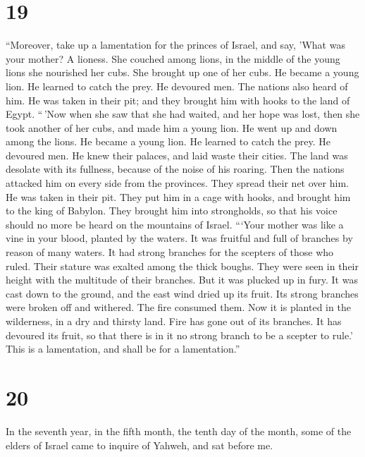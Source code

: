 \hypertarget{section-17}{%
\section{19}\label{section-17}}

 ``Moreover, take up a lamentation for the princes of
Israel,  and say, 'What was your mother? A lioness. She
couched among lions, in the middle of the young lions she nourished her
cubs.  She brought up one of her cubs. He became a young
lion. He learned to catch the prey. He devoured men.  The
nations also heard of him. He was taken in their pit; and they brought
him with hooks to the land of Egypt.  ``\,'Now when she
saw that she had waited, and her hope was lost, then she took another of
her cubs, and made him a young lion.  He went up and down
among the lions. He became a young lion. He learned to catch the prey.
He devoured men.  He knew their palaces, and laid waste
their cities. The land was desolate with its fullness, because of the
noise of his roaring.  Then the nations attacked him on
every side from the provinces. They spread their net over him. He was
taken in their pit.  They put him in a cage with hooks,
and brought him to the king of Babylon. They brought him into
strongholds, so that his voice should no more be heard on the mountains
of Israel.  ```Your mother was like a vine in your blood,
planted by the waters. It was fruitful and full of branches by reason of
many waters.  It had strong branches for the scepters of
those who ruled. Their stature was exalted among the thick boughs. They
were seen in their height with the multitude of their branches.
 But it was plucked up in fury. It was cast down to the
ground, and the east wind dried up its fruit. Its strong branches were
broken off and withered. The fire consumed them.  Now it
is planted in the wilderness, in a dry and thirsty land. 
Fire has gone out of its branches. It has devoured its fruit, so that
there is in it no strong branch to be a scepter to rule.' This is a
lamentation, and shall be for a lamentation.''

\hypertarget{section-18}{%
\section{20}\label{section-18}}

 In the seventh year, in the fifth month, the tenth day of
the month, some of the elders of Israel came to inquire of Yahweh, and
sat before me.

